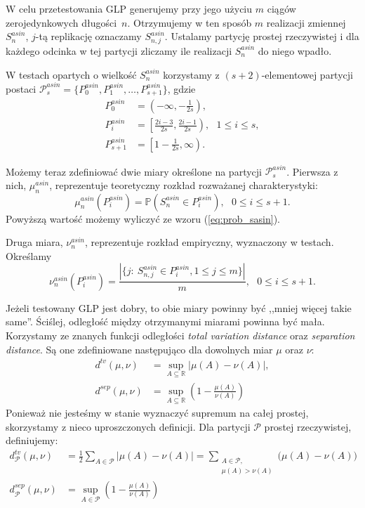 \documentclass[a4paper,11pt,twoside]{book}
\newcommand{\Pro}[1]{\mathbb{P}\left(#1\right)}
\newcommand{\Sasin}[1]{S^{asin}_#1}
\theoremstyle{definition}
\begin{document}
W celu przetestowania GLP generujemy przy jego użyciu $m$ ciągów zerojedynkowych długości~$n$. Otrzymujemy w ten sposób $m$ realizacji zmiennej $\Sasin{n}$, $j$-tą replikację oznaczamy $\Sasin{{n,j}}$. Ustalamy partycję prostej rzeczywistej i dla każdego odcinka w tej partycji zliczamy ile realizacji $\Sasin{n}$ do niego wpadło.

W testach opartych o wielkość $\Sasin{n}$ korzystamy z $(s+2)$-elementowej partycji postaci $\mathcal{P}^{asin}_s = \{ P^{asin}_0, P^{asin}_1, \ldots, P^{asin}_{s+1}\}$, gdzie
\begin{equation*}
\begin{split}
  P^{asin}_0 &= \left(-\infty, -\frac{1}{2s}\right),\\
  P^{asin}_i &= \left[\frac{2i-3}{2s}, \frac{2i-1}{2s} \right),\ \ \ 1 \leq i \leq s,\\
  P^{asin}_{s+1} &= \left[1- \frac{1}{2s}, \infty\right).
\end{split}
\end{equation*}

Możemy teraz zdefiniować dwie miary określone na partycji  $\mathcal{P}^{asin}_s$. Pierwsza z nich, $ \mu^{asin}_n$, reprezentuje teoretyczny rozkład rozważanej charakterystyki:
\begin{equation}
 \mu^{asin}_n \left( P^{asin}_i \right) = \Pro{\Sasin{n} \in P^{asin}_i},\ \ \ 0 \leq i \leq s+1.
\end{equation}
Powyższą wartość możemy wyliczyć ze wzoru (\ref{eq:prob_sasin}).

Druga miara, $\nu^{asin}_n$,  reprezentuje rozkład empiryczny, wyznaczony w testach. Określamy
\begin{equation}
 \nu^{asin}_n \left( P^{asin}_i \right) = \frac{|\{ j:\ \Sasin{{n,j}} \in  P^{asin}_i, 1 \leq j \leq m\}|}{m},\ \ \ 0 \leq i \leq s+1.
\end{equation}


Jeżeli testowany GLP jest dobry, to obie miary powinny być ,,mniej więcej takie same''. Ściślej, odległość między otrzymanymi miarami powinna być mała. Korzystamy ze znanych funkcji odległości \textit{total variation distance} oraz \textit{separation distance}. Są one zdefiniowane następująco dla dowolnych miar $\mu$ oraz $\nu$:
\begin{align}
 d^{tv}(\mu, \nu) &= \sup_{A \subseteq \mathbb{R}} |\mu(A) - \nu(A)|,\\
 d^{sep}(\mu, \nu) &= \sup_{A \subseteq \mathbb{R}} \left(1 - \frac{\mu(A)}{\nu(A)}\right)
\end{align}
Ponieważ nie jesteśmy w stanie wyznaczyć supremum na całej prostej, skorzystamy z nieco uproszczonych definicji. Dla partycji $\mathcal{P}$ prostej rzeczywistej, definiujemy:
\begin{align}
 d^{tv}_\mathcal{P}(\mu, \nu) &= \frac{1}{2} \sum_{A \in \mathcal{P}} |\mu(A) - \nu(A)|
    = \sum_{\substack{A \in \mathcal{P},\\ \mu(A) >\nu(A)}} \Big(\mu(A) - \nu(A)\Big)\\
 d^{sep}_\mathcal{P}(\mu, \nu) &= \sup_{A \in \mathcal{P}}\left(1 - \frac{\mu(A)}{\nu(A)}\right)
\end{align}
\end{document}
